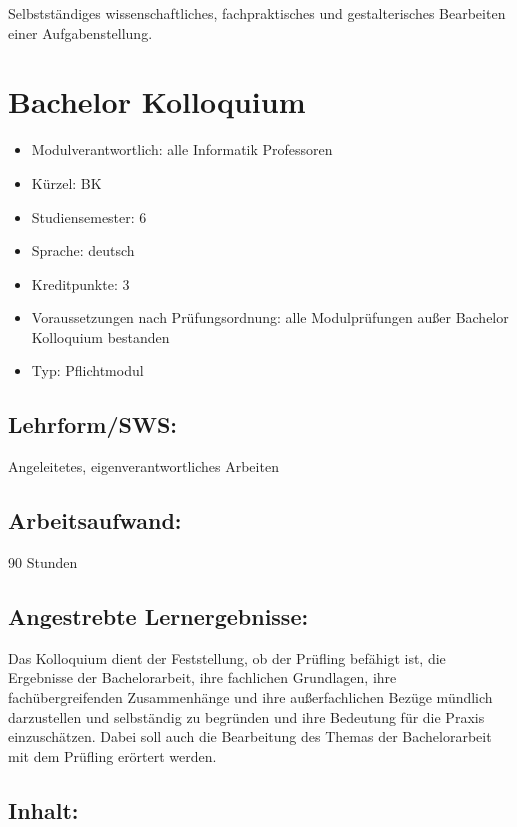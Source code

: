 Selbstständiges wissenschaftliches, fachpraktisches und gestalterisches
Bearbeiten einer Aufgabenstellung.

\chapter{Bachelor Kolloquium}\label{bachelor-kolloquium}

\begin{itemize}
\tightlist
\item
  Modulverantwortlich: alle Informatik Professoren
\item
  Kürzel: BK
\item
  Studiensemester: 6
\item
  Sprache: deutsch
\item
  Kreditpunkte: 3
\item
  Voraussetzungen nach Prüfungsordnung: alle Modulprüfungen außer
  Bachelor Kolloquium bestanden
\item
  Typ: Pflichtmodul
\end{itemize}

\section*{Lehrform/SWS:}\label{lehrformsws-4}

Angeleitetes, eigenverantwortliches Arbeiten

\section*{Arbeitsaufwand:}\label{arbeitsaufwand-4}

90 Stunden

\section*{Angestrebte
Lernergebnisse:}\label{angestrebte-lernergebnisse-4}

Das Kolloquium dient der Feststellung, ob der Prüfling befähigt ist, die
Ergebnisse der Bachelorarbeit, ihre fachlichen Grundlagen, ihre
fachübergreifenden Zusammenhänge und ihre außerfachlichen Bezüge
mündlich darzustellen und selbständig zu begründen und ihre Bedeutung
für die Praxis einzuschätzen. Dabei soll auch die Bearbeitung des Themas
der Bachelorarbeit mit dem Prüfling erörtert werden.

\section*{Inhalt:}\label{inhalt-4}

